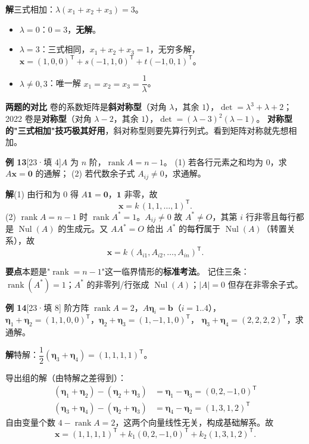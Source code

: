 \documentclass[10pt]{ctexart}
\newcommand{\rank}{\operatorname{rank}}
\newcommand{\Nul}{\operatorname{Nul}}
\newcommand{\TT}{^{\mathsf T}}
\newcommand{\yiii}[1]{\textcolor{y23}{[23·#1]}}
\begin{document}
\textbf{解}\quad 三式相加：$\lambda(x_1+x_2+x_3)=3$。

\begin{itemize}
\item $\lambda=0$：$0=3$，\textbf{无解}。
\item $\lambda=3$：三式相同，$x_1+x_2+x_3=1$，无穷多解，
$\mathbf x=(1,0,0)\TT+s(-1,1,0)\TT+t(-1,0,1)\TT$。
\item $\lambda\ne0,3$：唯一解 $x_1=x_2=x_3=\dfrac{1}{\lambda}$。
\end{itemize}

\begin{tipbox}
\textbf{两题的对比} 卷的系数矩阵是\textbf{斜对称型}（对角 $\lambda$，其余 $1$），$\det=\lambda^3+\lambda+2$；
2022 卷是\textbf{对称型}（对角 $\lambda-2$，其余 $1$），$\det=(\lambda-3)^2(\lambda-1)$。
\textbf{对称型的"三式相加"技巧极其好用}，斜对称型则要先算行列式。看到矩阵对称就先想相加。
\end{tipbox}

\medskip
\textbf{例 13}\yiii{填 4}\quad $A$ 为 $n$ 阶，$\rank A=n-1$。
(1) 若各行元素之和均为 $0$，求 $A\mathbf x=\mathbf 0$ 的通解；
(2) 若代数余子式 $A_{ij}\neq0$，求通解。

\textbf{解}\quad (1) 由行和为 $0$ 得 $A\mathbf 1=\mathbf 0$，$\mathbf 1$ 非零，故
\[
\mathbf x=k\,(1,1,\dots,1)\TT .
\]
(2) $\rank A=n-1$ 时 $\rank A^{*}=1$。$A_{ij}\neq0$ 故 $A^{*}\neq O$，其第 $i$ 行非零且每行都是 $\Nul(A)$ 的生成元。又 $AA^{*}=O$ 给出 $A^{*}$ 的每\textbf{行}属于 $\Nul(A)$（转置关系），故
\[
\mathbf x=k\,(A_{i1},A_{i2},\dots,A_{in})\TT .
\]

\begin{tipbox}
\textbf{要点}\quad 本题是"$\rank=n-1$"这一临界情形的\textbf{标准考法}。
记住三条：$\rank(A^{*})=1$；$A^{*}$ 的非零列/行张成 $\Nul(A)$；$|A|=0$ 但存在非零余子式。
\end{tipbox}

\medskip
\textbf{例 14}\yiii{填 8} 阶方阵 $\rank A=2$，$A\boldsymbol\eta_i=\mathbf b$（$i=1..4$），
$\boldsymbol\eta_1+\boldsymbol\eta_2=(1,1,0,0)\TT$，$\boldsymbol\eta_2+\boldsymbol\eta_3=(1,-1,1,0)\TT$，
$\boldsymbol\eta_3+\boldsymbol\eta_4=(2,2,2,2)\TT$，求通解。

\textbf{解}\quad 特解：$\dfrac12(\boldsymbol\eta_3+\boldsymbol\eta_4)=(1,1,1,1)\TT$。

导出组的解（由特解之差得到）：
\begin{align*}
(\boldsymbol\eta_1+\boldsymbol\eta_2)-(\boldsymbol\eta_2+\boldsymbol\eta_3)&=\boldsymbol\eta_1-\boldsymbol\eta_3=(0,2,-1,0)\TT\\
(\boldsymbol\eta_3+\boldsymbol\eta_4)-(\boldsymbol\eta_2+\boldsymbol\eta_3)&=\boldsymbol\eta_4-\boldsymbol\eta_2=(1,3,1,2)\TT
\end{align*}
自由变量个数 $4-\rank A=2$，这两个向量线性无关，构成基础解系。故
\[
\mathbf x=(1,1,1,1)\TT+k_1(0,2,-1,0)\TT+k_2(1,3,1,2)\TT .
\]
\end{document}

